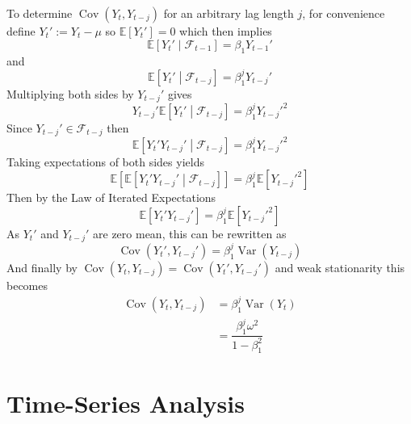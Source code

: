 \documentclass[11pt]{report} %
\begin{document}
To determine $\operatorname{Cov}\left(Y_{t}, Y_{t - j}\right)$ for an arbitrary lag length $j$, for convenience define $Y_{t}' := Y_{t} - \mu$ so $\mathbb{E}\left[Y_{t}'\right] = 0$ which then implies
\begin{equation}
\mathbb{E}\left[Y_{t}'\middle|\mathcal{F}_{t-1}\right] = \beta_{1}Y_{t - 1}'
\end{equation}
and
\begin{equation}
\mathbb{E}\left[Y_{t}'\middle|\mathcal{F}_{t-j}\right] = \beta_{1}^{j}Y_{t - j}'
\end{equation}
Multiplying both sides by $Y_{t - j}'$ gives
\begin{equation}
Y_{t - j}'\mathbb{E}\left[Y_{t}'\middle|\mathcal{F}_{t-j}\right] = \beta_{1}^{j}Y_{t - j}'^{2}
\end{equation}
Since $Y_{t - j}' \in \mathcal{F}_{t- j}$ then
\begin{equation}
\mathbb{E}\left[Y_{t}'Y_{t - j}'\middle|\mathcal{F}_{t-j}\right] = \beta_{1}^{j}Y_{t - j}'^{2}
\end{equation}
Taking expectations of both sides yields
\begin{equation}
\mathbb{E}\left[\mathbb{E}\left[Y_{t}'Y_{t - j}'\middle|\mathcal{F}_{t-j}\right]\right] = \beta_{1}^{j}\mathbb{E}\left[Y_{t - j}'^{2}\right]
\end{equation}
Then by the Law of Iterated Expectations
\begin{equation}
\mathbb{E}\left[Y_{t}'Y_{t - j}'\right] = \beta_{1}^{j}\mathbb{E}\left[Y_{t - j}'^{2}\right]
\end{equation}
As $Y_{t}'$ and $Y_{t - j}'$ are zero mean, this can be rewritten as
\begin{equation}
\operatorname{Cov}\left(Y_{t}', Y_{t - j}'\right) = \beta_{1}^{j}\operatorname{Var}\left(Y_{t - j}\right)
\end{equation}
And finally by $\operatorname{Cov}\left(Y_{t}, Y_{t - j}\right) = \operatorname{Cov}\left(Y_{t}', Y_{t - j}'\right)$ and weak stationarity this becomes
\begin{align}
\operatorname{Cov}\left(Y_{t}, Y_{t - j}\right) &= \beta_{1}^{j}\operatorname{Var}\left(Y_{t}\right) \\
&= \dfrac{\beta_{1}^{j}\omega^{2}}{1 - \beta_{1}^{2}}
\end{align}

\section{Time-Series Analysis}
\end{document}
